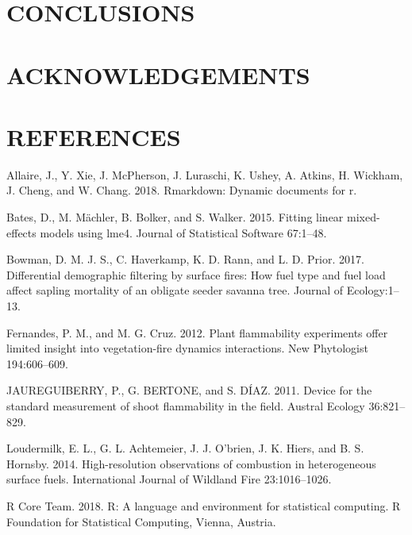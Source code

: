 \documentclass[11pt,a4paper]{article}
\begin{document}
\hypertarget{conclusions}{%
\section{CONCLUSIONS}\label{conclusions}}

\hypertarget{acknowledgements}{%
\section{ACKNOWLEDGEMENTS}\label{acknowledgements}}

\hypertarget{references}{%
\section{REFERENCES}\label{references}}

\hypertarget{refs}{}
\leavevmode\hypertarget{ref-Allaire_2018}{}%
Allaire, J., Y. Xie, J. McPherson, J. Luraschi, K. Ushey, A. Atkins, H.
Wickham, J. Cheng, and W. Chang. 2018. Rmarkdown: Dynamic documents for
r.

\leavevmode\hypertarget{ref-Bates_2015}{}%
Bates, D., M. Mächler, B. Bolker, and S. Walker. 2015. Fitting linear
mixed-effects models using lme4. Journal of Statistical Software
67:1--48.

\leavevmode\hypertarget{ref-Bowman2017}{}%
Bowman, D. M. J. S., C. Haverkamp, K. D. Rann, and L. D. Prior. 2017.
Differential demographic filtering by surface fires: How fuel type and
fuel load affect sapling mortality of an obligate seeder savanna tree.
Journal of Ecology:1--13.

\leavevmode\hypertarget{ref-Fernandes2012}{}%
Fernandes, P. M., and M. G. Cruz. 2012. Plant flammability experiments
offer limited insight into vegetation-fire dynamics interactions. New
Phytologist 194:606--609.

\leavevmode\hypertarget{ref-JAUREGUIBERRY2011}{}%
JAUREGUIBERRY, P., G. BERTONE, and S. DÍAZ. 2011. Device for the
standard measurement of shoot flammability in the field. Austral Ecology
36:821--829.

\leavevmode\hypertarget{ref-Loudermilk2014}{}%
Loudermilk, E. L., G. L. Achtemeier, J. J. O'brien, J. K. Hiers, and B.
S. Hornsby. 2014. High-resolution observations of combustion in
heterogeneous surface fuels. International Journal of Wildland Fire
23:1016--1026.

\leavevmode\hypertarget{ref-R_Core_Team_2018}{}%
R Core Team. 2018. R: A language and environment for statistical
computing. R Foundation for Statistical Computing, Vienna, Austria.
\end{document}

